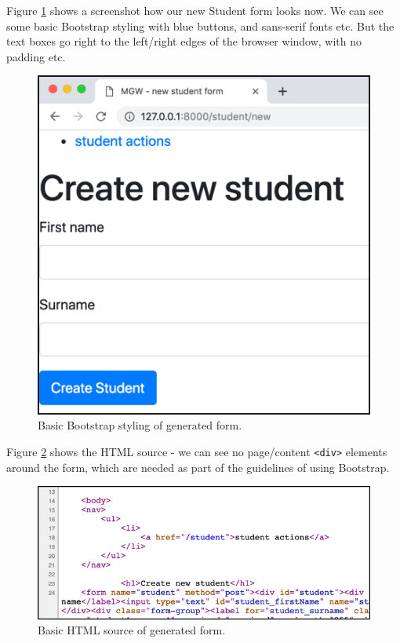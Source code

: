 \documentclass[a4paperpaper,openright]{book}
\begin{document}
Figure \ref{form_bootstrap} shows a screenshot how our new Student form
looks now. We can see some basic Bootstrap styling with blue buttons,
and sans-serif fonts etc. But the text boxes go right to the left/right
edges of the browser window, with no padding etc.

\begin{figure}
\centering
\includegraphics{./tex2pdf.-51e064f4751cea0e/15a6d51f6220970d5520415ccb4864ae58ae9ad9.png}
\caption{Basic Bootstrap styling of generated form.
\label{form_bootstrap}}
\end{figure}

Figure \ref{form_bootstrap_source} shows the HTML source - we can see no
page/content \texttt{\textless{}div\textgreater{}} elements around the
form, which are needed as part of the guidelines of using Bootstrap.

\begin{figure}
\centering
\includegraphics{./tex2pdf.-51e064f4751cea0e/f9087b127b21a746a42bee0755ac2abfb144b89c.png}
\caption{Basic HTML source of generated form.
\label{form_bootstrap_source}}
\end{figure}
\end{document}
